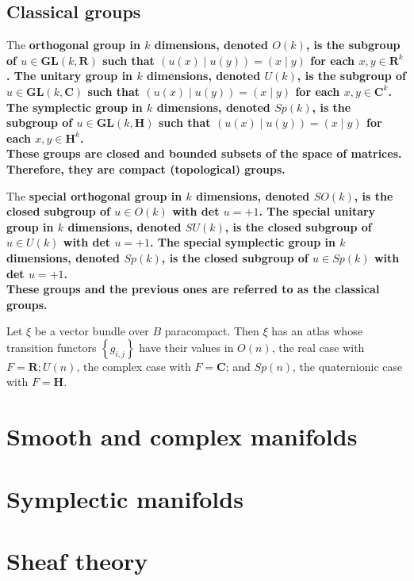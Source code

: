 \section{Classical groups}


The \bf{orthogonal group} in $k$ dimensions, denoted $O(k)$, is the subgroup of $u \in \mathbf{G L}(k, \mathbf{R})$ such that $(u(x) \mid u(y))=(x \mid y)$ for each $x, y \in \mathbf{R}^k$. The \bf{unitary group} in $k$ dimensions, denoted $U(k)$, is the subgroup of $u \in \mathbf{G L}(k, \mathbf{C})$ such that $(u(x) \mid u(y))=(x \mid y)$ for each $x, y \in \mathbf{C}^k$. The \bf{symplectic group} in $k$ dimensions, denoted $S p(k)$, is the subgroup of $u \in \mathbf{G L}(k, \mathbf{H})$ such that $(u(x) \mid u(y))=(x \mid y)$ for each $x, y \in \mathbf{H}^k$.\\
These groups are closed and bounded subsets of the space of matrices. Therefore, they are compact (topological) groups. 

The \bf{special orthogonal group} in $k$ dimensions, denoted $S O(k)$, is the closed subgroup of $u \in O(k)$ with det $u=+1$. The \bf{special unitary group} in $k$ dimensions, denoted $S U(k)$, is the closed subgroup of $u \in U(k)$ with det $u=+1$. The \bf{special symplectic group} in $k$ dimensions, denoted $S p(k)$, is the closed subgroup of $u \in S p(k)$ with det $u=+1$.\\
These groups and the previous ones are referred to as the \bf{classical groups.}

\begin{theo}
    Let $\xi$ be a vector bundle over $B$ paracompact. Then $\xi$ has an atlas whose transition functors $\left\{g_{i, j}\right\}$ have their values in $O(n)$, the real case with $F=\mathbf{R} ; U(n)$, the complex case with $F=\mathbf{C}$; and $S p(n)$, the quaternionic case with $F=\mathbf{H}$.   
\end{theo}

\chapter{Smooth and complex manifolds}



\chapter{Symplectic manifolds}

\chapter{Sheaf theory}

